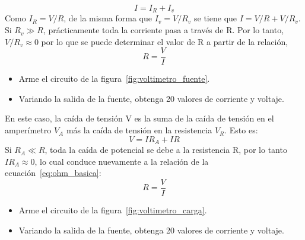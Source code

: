 \documentclass[12pt, a4paper]{article}
\begin{document}
\begin{equation}
    I = I_R + I_v
\end{equation}
Como $I_R = V/R$, de la misma forma que $I_v = V/R_v$ se tiene que $I = V/R + V/R_v$.
Si $R_v \gg R$, prácticamente toda la corriente pasa a través de R. Por lo tanto, $V/R_v \approx 0$ por lo que se 
puede determinar el valor de R a partir de la relación,
\begin{equation}
    R = \frac{V}{I}
\end{equation}
\begin{itemize}
    \item Arme el circuito de la figura~\ref{fig:voltimetro_fuente}.
    \item Variando la salida de la fuente, obtenga 20 valores de corriente y voltaje.
\end{itemize}
En este caso, la caída de tensión V es la suma de la caída de tensión en el amperímetro $V_A$ más la caída de tensión 
en la resistencia $V_R$. Esto es:
\begin{equation}
    V = I R_A + I R
\end{equation}
Si $R_A \ll R$, toda la caída de potencial se debe a la resistencia R, por lo tanto $I R_A \approx 0$, lo cual conduce 
nuevamente a la relación de la ecuación~\eqref{eq:ohm_basica}:
\begin{equation}
    R = \frac{V}{I}
\end{equation}
\begin{itemize}
    \item Arme el circuito de la figura~\ref{fig:voltimetro_carga}.
    \item Variando la salida de la fuente, obtenga 20 valores de corriente y voltaje.
\end{itemize}
\end{document}

